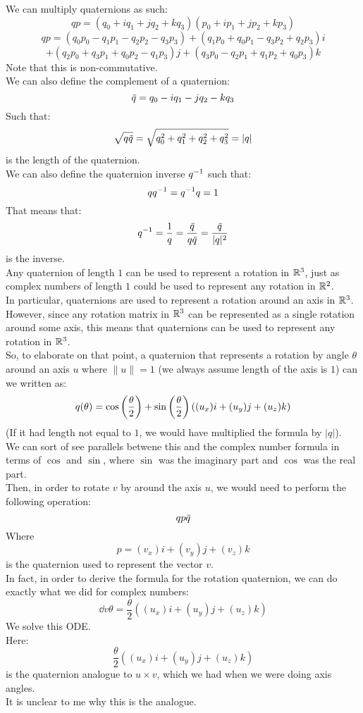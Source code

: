 \documentclass[12pt]{article}
\begin{document}
We can multiply quaternions as such:
\[ qp = (q_0 + iq_1 + jq_2 + kq_3)
(p_0 + ip_1 + jp_2 + kp_3) \]
\[ qp = (q_0p_0 - q_1p_1 - q_2p_2 - q_3p_3) 
+ (q_1p_0 + q_0p_1 - q_3p_2 + q_2p_3)i \]
\[ + (q_2p_0 + q_3p_1 + q_0p_2 - q_1p_3)j 
+ (q_3p_0 - q_2p_1 + q_1p_2 + q_0p_3)k \]
Note that this is non-commutative. \\

We can also define the complement of a quaternion:
\[ \,\overline{\!{q}} = q_0 - iq_1 - jq_2 - kq_3 \]
Such that:
\[ \sqrt{q\,\overline{\!{q}}} 
= \sqrt{q_0^2 + q_1^2 + q_2^2 + q_3^2} = |q| \]
is the length of the quaternion. \\

We can also define the quaternion inverse $q^{-1}$
such that:
\[ qq^{-1} = q^{-1} q = 1 \]
That means that:
\[ q^{-1} = \dfrac{1}{q}
= \dfrac{\,\overline{\!{q}}}{q\,\overline{\!{q}}}
= \dfrac{\,\overline{\!{q}}}{|q|^2} \]
is the inverse. \\

Any quaternion of length $1$ can be used
to represent a rotation in $\mathbb{R}^3$,
just as complex numbers of length $1$
could be used to represent any 
rotation in $\mathbb{R}^2$. \\
In particular, quaternions are used
to represent a rotation around an axis in $\mathbb{R}^3$.
However, since any rotation matrix in $\mathbb{R}^3$
can be represented as a single rotation
around some axis,
this means that quaternions can be used
to represent any rotation in $\mathbb{R}^3$. \\

So, to elaborate on that point,
a quaternion that represents a rotation
by angle $\theta$
around an axis $u$ where $\|u\| = 1$
(we always assume length of the axis is $1$)
can we written as:
\[ q(\theta) = \cos \left( \dfrac{\theta}{2} \right)
+ \sin \left( \dfrac{\theta}{2} \right)
((u_x)i + (u_y)j + (u_z)k) \]
(If it had length not equal to $1$,
we would have multiplied the formula by $|q|$). \\
We can sort of see parallels
betwene this and the complex number
formula in terms of $\cos$ and $\sin$,
where $\sin$ was the imaginary part and
$\cos$ was the real part. \\

Then, in order to rotate $v$
by around the axis $u$,
we would need to perform the following
operation:
\[ qp\,\overline{\!{q}} \]
Where
\[ p = (v_x)i + (v_y)j + (v_z)k \]
is the quaternion used to represent
the vector $v$. \\

In fact, in order to derive the
formula for the rotation quaternion,
we can do exactly what we did for complex numbers:
\[ \dd{v}{\theta} = \dfrac{\theta}{2}
((u_x)i + (u_y)j + (u_z)k) \]
We solve this ODE. \\
Here:
\[ \dfrac{\theta}{2}
((u_x)i + (u_y)j + (u_z)k) \]
is the quaternion analogue to $u \times v$,
which we had when we were doing axis angles. \\
It is unclear to me why this is the analogue. \\
\end{document}
